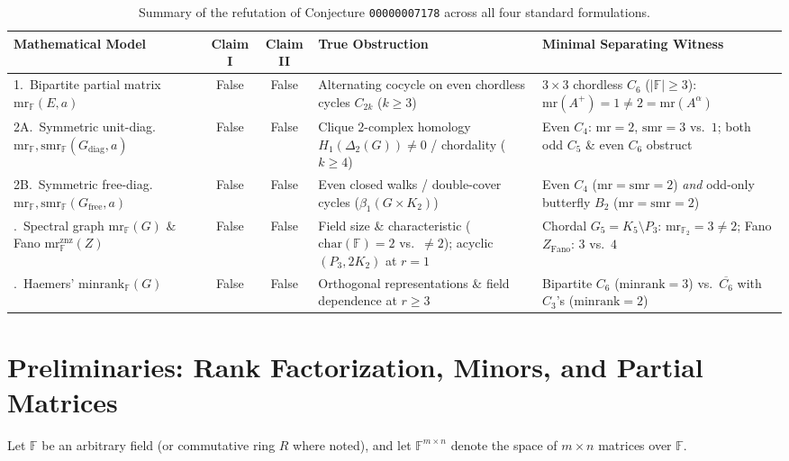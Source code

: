 \documentclass[11pt]{article}
\theoremstyle{definition}
\newcommand{\F}{\mathbb{F}}
\newcommand{\mr}{\mathrm{mr}}
\newcommand{\smr}{\mathrm{smr}}
\newcommand{\minrank}{\mathrm{minrank}}
\begin{document}
\begin{table}[ht]
\centering
\small
\begin{tabular}{@{}p{3.9cm}cc p{3.9cm} p{4.2cm}@{}}
\toprule
\textbf{Mathematical Model} & \textbf{Claim I} & \textbf{Claim II} & \textbf{True Obstruction} & \textbf{Minimal Separating Witness} \\
\midrule
1.\ Bipartite partial matrix $\mr_{\F}(E,a)$ & False & False & Alternating cocycle on even chordless cycles $C_{2k}$ ($k\ge 3$) & $3\times 3$ chordless $C_6$ ($|\F|\ge 3$): $\mr(A^+)=1 \neq 2=\mr(A^\alpha)$ \\
\addlinespace[3pt]
2A.\ Symmetric unit-diag.\ $\mr_{\F},\smr_{\F}(G_{\mathrm{diag}},a)$ & False & False & Clique $2$-complex homology $H_1(\Delta_2(G))\neq 0$ / chordality ($k\ge 4$) & Even $C_4$: $\mr=2$, $\smr=3$ vs.\ $1$; both odd $C_5$ \& even $C_6$ obstruct \\
\addlinespace[3pt]
2B.\ Symmetric free-diag.\ $\mr_{\F},\smr_{\F}(G_{\mathrm{free}},a)$ & False & False & Even closed walks / double-cover cycles ($\beta_1(G\times K_2)$) & Even $C_4$ ($\mr=\smr=2$) \emph{and} odd-only butterfly $B_2$ ($\mr=\smr=2$) \\
\addlinespace[3pt]
3.\ Spectral graph $\mr_{\F}(G)$ \& Fano $\mr_{\F}^{\mathrm{znz}}(Z)$ & False & False & Field size \& characteristic ($\mathrm{char}(\F)=2$ vs.\ $\neq 2$); acyclic $(P_3,2K_2)$ at $r=1$ & Chordal $G_5 = K_5\setminus P_3$: $\mr_{\F_2}=3 \neq 2$; Fano $Z_{\mathrm{Fano}}$: $3$ vs.\ $4$ \\
\addlinespace[3pt]
4.\ Haemers' $\minrank_{\F}(G)$ & False & False & Orthogonal representations \& field dependence at $r\ge 3$ & Bipartite $C_6$ ($\minrank=3$) vs.\ $\overline{C_6}$ with $C_3$'s ($\minrank=2$) \\
\bottomrule
\end{tabular}
\caption{Summary of the refutation of Conjecture \texttt{00000007178} across all four standard formulations.}
\label{tab:summary}
\end{table}

\section{Preliminaries: Rank Factorization, Minors, and Partial Matrices}

Let $\F$ be an arbitrary field (or commutative ring $R$ where noted), and let $\F^{m\times n}$ denote the space of $m\times n$ matrices over $\F$.
\end{document}
